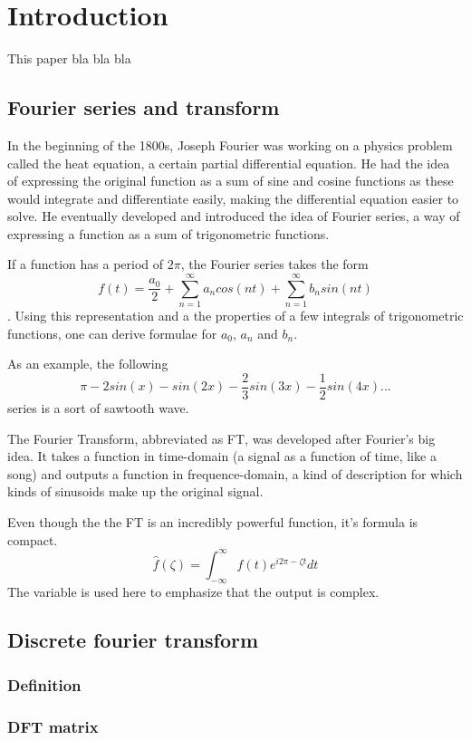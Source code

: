 \section{Introduction}
This paper bla bla bla

\subsection{Fourier series and transform}
In the beginning of the 1800s, Joseph Fourier was working on a physics problem called the heat equation, a certain partial differential equation. He had the idea of expressing the original function as a sum of sine and cosine functions as these would integrate and differentiate easily, making the differential equation easier to solve. He eventually developed and introduced the idea of Fourier series, a way of expressing a function as a sum of trigonometric functions. 

If a function has a period of $2\pi$, the Fourier series takes the form $$f(t) = \frac{a_0}{2} + \sum_{n=1}^{\infty}a_ncos(nt)+\sum_{n=1}^{\infty}b_nsin(nt)$$. Using this representation and a the properties of a few integrals of trigonometric functions, one can derive formulae for $a_0$, $a_n$ and $b_n$.

As an example, the following $$\pi -2sin(x) -sin(2x) -\frac{2}{3}sin(3x) -\frac{1}{2}sin(4x) ... $$ series is a sort of sawtooth wave.

The Fourier Transform, abbreviated as FT, was developed after Fourier's big idea. It takes a function in time-domain (a signal as a function of time, like a song) and outputs a function in frequence-domain, a kind of description for which kinds of sinusoids make up the original signal. 

Even though the the FT is an incredibly powerful function, it's formula is compact. 
$$\hat{f}(\zeta) = \int_{-\infty}^{\infty} f(t)e^{i2\pi-\zeta t} dt$$
The variable \zeta is used here to emphasize that the output is complex.
\subsection{Discrete fourier transform}
\subsubsection{Definition}
\subsubsection{DFT matrix}

